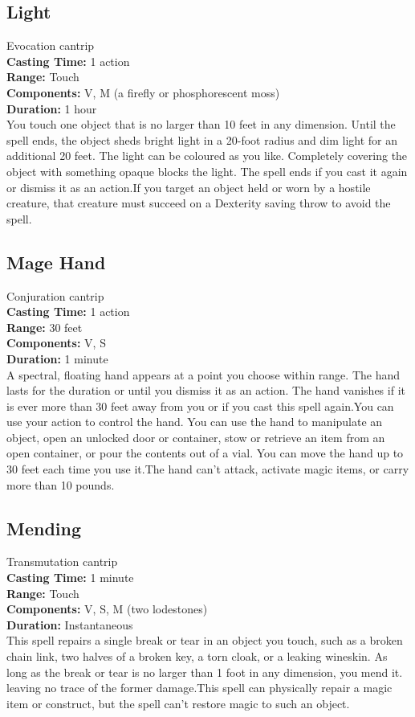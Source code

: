 \documentclass[11pt, A4paper, english]{article}
\begin{document}
		\subsection{Light}
Evocation cantrip \\
\textbf{Casting Time:} 1 action \\
\textbf{Range:} Touch \\
\textbf{Components:} V, M (a firefly or phosphorescent moss) \\
\textbf{Duration:} 1 hour \\
You touch one object that is no larger than  10 feet in any dimension. Until the spell ends, the object sheds bright light in a 20-foot radius and dim light for an additional 20 feet. The light can be coloured as you like. Completely covering the object with something opaque blocks the light. The spell ends if you cast it again or dismiss it as an action.If you target an object held or worn by a hostile creature, that creature must succeed on a Dexterity saving throw to avoid the spell.

		\subsection{Mage Hand}
Conjuration cantrip \\
\textbf{Casting Time:} 1 action \\
\textbf{Range:} 30 feet \\
\textbf{Components:} V, S \\
\textbf{Duration:} 1 minute \\
A spectral, floating hand appears at a point you choose within range. The hand lasts for the duration or until you dismiss it as an action. The hand vanishes if it is ever more than 30 feet away from you or if you cast this spell again.You can use your action to control the hand. You can use the hand to manipulate an object, open an unlocked door or container, stow or retrieve an item from an open container, or pour the contents out of a vial. You can move the hand up to 30 feet each time you use it.The hand can’t attack, activate magic items, or carry more than 10 pounds.

		\subsection{Mending}
Transmutation cantrip \\
\textbf{Casting Time:} 1 minute \\
\textbf{Range:} Touch \\
\textbf{Components:} V, S, M (two lodestones) \\
\textbf{Duration:} Instantaneous \\
This spell repairs a single break or tear in an object you touch, such as a broken chain link, two halves of a broken key, a torn cloak, or a leaking wineskin. As long as the break or tear is no larger than  1  foot in any dimension, you mend it. leaving no trace of the former damage.This spell can physically repair a magic item or construct, but the spell can’t restore magic to such an object.
\end{document}
